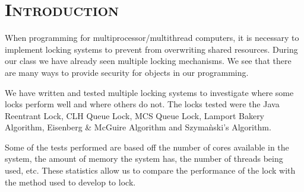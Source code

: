 \documentclass[FinalReport.tex]{subfiles}
\begin{document}
\bigskip

\section*{\textsc{\Large Introduction}}

	When programming for multiprocessor/multithread computers, it is necessary to implement locking systems to prevent from overwriting shared resources.  During our class we have already seen multiple locking mechanisms.  We see that there are many ways to provide security for objects in our programming.  
	
	We have written and tested multiple locking systems to investigate where some locks perform well and where others do not.  The locks tested were the Java Reentrant Lock, CLH Queue Lock, MCS Queue Lock, Lamport Bakery Algorithm, Eisenberg \& McGuire Algorithm and Szyma\`{n}ski's Algorithm.  
	
	Some of the tests performed are based off the number of cores available in the system, the amount of memory the system has, the number of threads being used, etc.  These statistics allow us to compare the performance of the lock with the method used to develop to lock.
\end{document}
